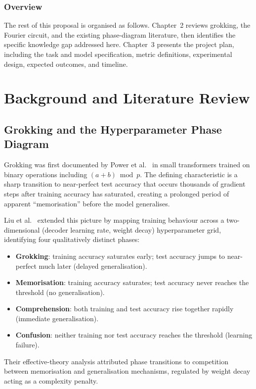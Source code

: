 \documentclass[12pt,openany,a4paper]{book}
\begin{document}
\subsection{Overview}

The rest of this proposal is organised as follows.
Chapter~2 reviews grokking, the Fourier circuit, and the existing phase-diagram literature, then identifies the specific knowledge gap addressed here.
Chapter~3 presents the project plan, including the task and model specification, metric definitions, experimental design, expected outcomes, and timeline.

\chapter{Background and Literature Review}

\section{Grokking and the Hyperparameter Phase Diagram}

Grokking was first documented by Power et al.\ \cite{power2022grokking}
in small transformers trained on binary operations including
$(a+b)\bmod p$.
The defining characteristic is a sharp transition to near-perfect test
accuracy that occurs thousands of gradient steps after training
accuracy has saturated, creating a prolonged period of apparent
``memorisation'' before the model generalises.

Liu et al.\ \cite{liu2022towards} extended this picture by mapping
training behaviour across a two-dimensional (decoder learning rate,
weight decay) hyperparameter grid, identifying four qualitatively
distinct phases:
\begin{itemize}
  \item \textbf{Grokking}: training accuracy saturates early; test
    accuracy jumps to near-perfect much later (delayed generalisation).
  \item \textbf{Memorisation}: training accuracy saturates; test
    accuracy never reaches the threshold (no generalisation).
  \item \textbf{Comprehension}: both training and test accuracy rise
    together rapidly (immediate generalisation).
  \item \textbf{Confusion}: neither training nor test accuracy reaches
    the threshold (learning failure).
\end{itemize}
Their effective-theory analysis attributed phase transitions to
competition between memorisation and generalisation mechanisms,
regulated by weight decay acting as a complexity penalty.
\end{document}
